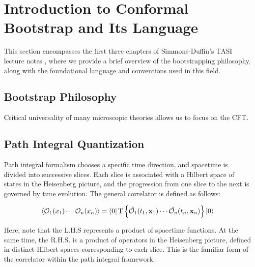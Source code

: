 \documentclass[12pt]{article}
\numberwithin{equation}{section}
\newcommand\<\langle
\renewcommand\>\rangle
\renewcommand\.{\cdot}
\begin{document}
\section{Introduction to Conformal Bootstrap and Its Language}

This section encompasses the first three chapters of Simmons-Duffin's TASI lecture notes \cite{simmonsduffin2016tasilecturesconformalbootstrap}, where we provide a brief overview of the bootstrapping philosophy, along with the foundational language and conventions used in this field.

\subsection{Bootstrap Philosophy}
Critical universality of many microscopic theories allows us to focus on the CFT.

\subsection{Path Integral Quantization}
Path integral formalism chooses a specific time direction, and spacetime is divided into successive slices. Each slice is associated with a Hilbert space of states in the Heisenberg picture, and the progression from one slice to the next is governed by time evolution. The general correlator is defined as follows:

\begin{equation}
    \langle\mathcal{O}_1(x_1)\cdots\mathcal{O}_n(x_n)\rangle = \bra{0}\text{T}\left\{\hat{\mathcal{O}_1}(t_1,\mathbf{x}_1)\cdots\hat{\mathcal{O}_n}(t_n,\mathbf{x}_n)\right\}\ket{0}
\end{equation}

Here, note that the L.H.S represents a product of spacetime functions. At the same time, the R.H.S. is a product of operators in the Heisenberg picture, defined in distinct Hilbert spaces corresponding to each slice. This is the familiar form of the correlator within the path integral framework.
\end{document}
